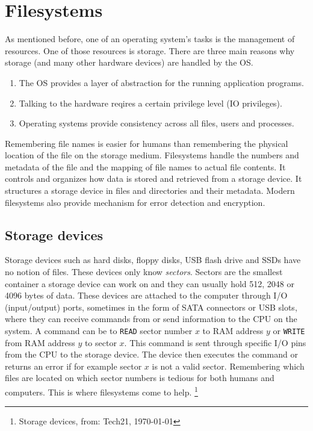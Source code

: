 \section{Filesystems}

As mentioned before, one of an operating system's tasks is the management of resources.
One of those resources is storage. There are three main reasons why storage (and many other
hardware devices) are handled by the OS.
\begin{enumerate}
\item The OS provides a layer of abstraction for the running application programs. 
\item Talking to the hardware reqires a certain privilege level (IO privileges).
\item Operating systems provide consistency across all files, users and processes.
\end{enumerate}

Remembering file names is easier for humans than remembering the physical location of the file on the storage medium. Filesystems handle
the numbers and metadata of the file and the mapping of file names to actual file contents. It
controls and organizes how data is stored and retrieved from a storage device. It structures a storage
device in files and directories and their metadata. Modern filesystems also provide mechanism for
error detection and encryption.

\subsection{Storage devices}

Storage devices such as hard disks, floppy disks, USB flash drive and SSDs have no notion of files.
These devices only know \textit{sectors}. Sectors are the smallest container a storage device
can work on and they can usually hold 512, 2048 or 4096 bytes of data. These devices are attached to
the computer through I/O (input/output) ports, sometimes in the form of SATA connectors or USB slots, where they can
receive commands from or send information to the CPU on the system. A command can be to \texttt{READ} sector number $x$ to RAM
address $y$ or \texttt{WRITE} from RAM address $y$ to sector $x$. This command is sent through
specific I/O pins from the CPU to the storage device. The device then executes the command or returns
an error if for example sector $x$ is not a valid sector. Remembering which files are located on
which sector numbers is tedious for both humans and computers. This is where filesystems come to help.
\footnote{Storage devices, from: Tech21, \today }

